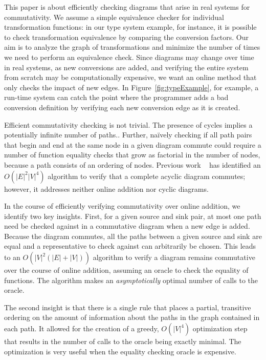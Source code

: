 \documentclass[sigplan,review]{acmart}
\begin{document}
This paper is about efficiently checking diagrams that arise in real systems for commutativity.
We assume a simple equivalence checker for individual transformation functions: in our type system example, for instance, it is possible to check transformation equivalence by comparing the conversion factors.
Our aim is to analyze the graph of transformations and minimize the number of times we need to perform an equivalence check.
Since diagrams may change over time in real systems, as new conversions are added, and verifying the entire system from scratch may be computationally expensive, we want an online method that only checks the impact of new edges.
In Figure~\ref{fig:typeExample}, for example, a run-time system can catch the point where the programmer adds a bad conversion definition by verifying each new conversion edge as it is created.

Efficient commutativity checking is not trivial.
The presence of cycles implies a potentially infinite number of paths..
Further, na\"{i}vely checking if all path pairs that begin and end at the same node in a given diagram commute could require a number of function equality checks that grow as factorial in the number of nodes, because a path consists of an ordering of nodes.
Previous work ~\cite{commutative} has identified an $O(|E|^2|V|^4)$ algorithm to verify that a complete acyclic diagram commutes; however, it addresses neither online addition nor cyclic diagrams.

In the course of efficiently verifying commutativity over online addition, we identify two key insights.
First, for a given source and sink pair, at most one path need be checked against in a commutative diagram when a new edge is added.
Because the diagram commutes, all the paths between a given source and sink are equal and a representative to check against can arbitrarily be chosen.
This leads to an $O(|V|^2(|E|+|V|))$ algorithm to verify a diagram remains commutative over the course of online addition, assuming an oracle to check the equality of functions.
The algorithm makes an \emph{asymptotically} optimal number of calls to the oracle.

The second insight is  that there is a single rule that places a partial, transitive ordering on the amount of information about the paths in the graph contained in each path.
It allowed for the creation of a greedy, $O(|V|^4)$ optimization step that results in the number of calls to the oracle being exactly minimal.
The optimization is very useful when the equality checking oracle is expensive.
\end{document}
